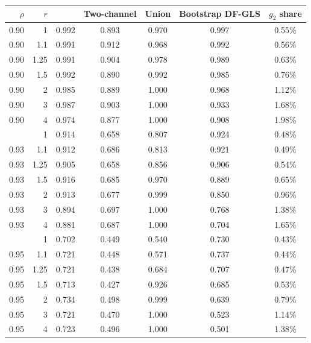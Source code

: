 \begin{tabular}{rrccccc}
\toprule
$\rho$ & $r$ & \RMGLS{} & Two-channel & Union & Bootstrap DF-GLS & $g_2$ share \\
\midrule
0.90 & 1 & 0.992 & 0.893 & 0.970 & 0.997 & 0.55\% \\
0.90 & 1.1 & 0.991 & 0.912 & 0.968 & 0.992 & 0.56\% \\
0.90 & 1.25 & 0.991 & 0.904 & 0.978 & 0.989 & 0.63\% \\
0.90 & 1.5 & 0.992 & 0.890 & 0.992 & 0.985 & 0.76\% \\
0.90 & 2 & 0.985 & 0.889 & 1.000 & 0.968 & 1.12\% \\
0.90 & 3 & 0.987 & 0.903 & 1.000 & 0.933 & 1.68\% \\
0.90 & 4 & 0.974 & 0.877 & 1.000 & 0.908 & 1.98\% \\
\addlinespace
0.93 & 1 & 0.914 & 0.658 & 0.807 & 0.924 & 0.48\% \\
0.93 & 1.1 & 0.912 & 0.686 & 0.813 & 0.921 & 0.49\% \\
0.93 & 1.25 & 0.905 & 0.658 & 0.856 & 0.906 & 0.54\% \\
0.93 & 1.5 & 0.916 & 0.685 & 0.970 & 0.889 & 0.65\% \\
0.93 & 2 & 0.913 & 0.677 & 0.999 & 0.850 & 0.96\% \\
0.93 & 3 & 0.894 & 0.697 & 1.000 & 0.768 & 1.38\% \\
0.93 & 4 & 0.881 & 0.687 & 1.000 & 0.704 & 1.65\% \\
\addlinespace
0.95 & 1 & 0.702 & 0.449 & 0.540 & 0.730 & 0.43\% \\
0.95 & 1.1 & 0.721 & 0.448 & 0.571 & 0.737 & 0.44\% \\
0.95 & 1.25 & 0.721 & 0.438 & 0.684 & 0.707 & 0.47\% \\
0.95 & 1.5 & 0.713 & 0.427 & 0.926 & 0.685 & 0.53\% \\
0.95 & 2 & 0.734 & 0.498 & 0.999 & 0.639 & 0.79\% \\
0.95 & 3 & 0.721 & 0.470 & 1.000 & 0.523 & 1.14\% \\
0.95 & 4 & 0.723 & 0.496 & 1.000 & 0.501 & 1.38\% \\
\bottomrule
\end{tabular}
